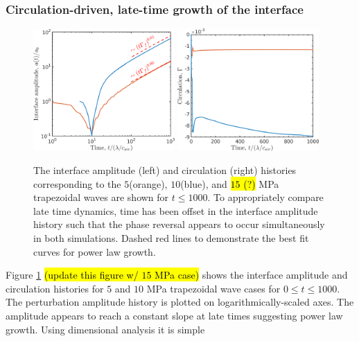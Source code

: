 \subsubsection{Circulation-driven, late-time growth of the interface}
\begin{figure}[h]
  \centering
  \includegraphics[width=0.48\textwidth]{./figs/lung_figs/interface_multi-amp_loglog_roe_t1000}
  \includegraphics[width=0.48\textwidth]{./figs/lung_figs/circulation_multi-amp_roe_t1000}
  \caption[The interface and circulation dependence on wave
  amplitude at long time]{The interface amplitude (left) and
    circulation (right) histories corresponding to the $5$(orange),
    $10$(blue), and \hl{$15$ (?)} MPa trapezoidal waves are shown
    for $t\leq 1000$. To appropriately compare late time dynamics,
    time has been offset in the interface amplitude history such
    that the phase reversal appears to occur simultaneously in both
    simulations. Dashed red lines to demonstrate the best fit curves
    for power law growth.}
  \label{fig:trapz_circ_interface_loglog}
\end{figure}
% 
Figure \ref{fig:trapz_circ_interface_loglog} \hl{(update this figure w/ $15$ MPa case)}
shows the interface amplitude and circulation histories for $5$ and
$10$ MPa trapezoidal wave cases for $0 \leq t\leq 1000$. The
perturbation amplitude history is plotted on logarithmically-scaled
axes. The amplitude appears to reach a constant slope at late times
suggesting power law growth. Using dimensional analysis it is simple
